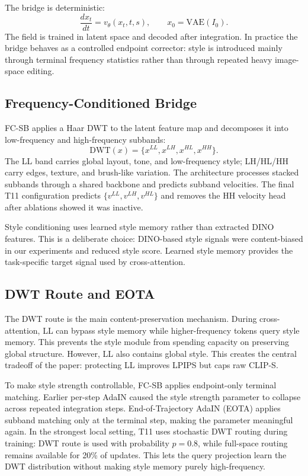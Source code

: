 \documentclass[letterpaper]{article}
\begin{document}
The bridge is deterministic:
\begin{equation}
    \frac{dx_t}{dt}=v_\theta(x_t,t,s),\qquad x_0=\mathrm{VAE}(I_0).
\end{equation}
The field is trained in latent space and decoded after integration. In practice the bridge behaves as a controlled endpoint corrector: style is introduced mainly through terminal frequency statistics rather than through repeated heavy image-space editing.

\subsection{Frequency-Conditioned Bridge}
FC-SB applies a Haar DWT to the latent feature map and decomposes it into low-frequency and high-frequency subbands:
\begin{equation}
    \mathrm{DWT}(x)=\{x^{LL},x^{LH},x^{HL},x^{HH}\}.
\end{equation}
The LL band carries global layout, tone, and low-frequency style; LH/HL/HH carry edges, texture, and brush-like variation. The architecture processes stacked subbands through a shared backbone and predicts subband velocities. The final T11 configuration predicts $\{v^{LL},v^{LH},v^{HL}\}$ and removes the HH velocity head after ablations showed it was inactive.

Style conditioning uses learned style memory rather than extracted DINO features. This is a deliberate choice: DINO-based style signals were content-biased in our experiments and reduced style score. Learned style memory provides the task-specific target signal used by cross-attention.

\subsection{DWT Route and EOTA}
The DWT route is the main content-preservation mechanism. During cross-attention, LL can bypass style memory while higher-frequency tokens query style memory. This prevents the style module from spending capacity on preserving global structure. However, LL also contains global style. This creates the central tradeoff of the paper: protecting LL improves LPIPS but caps raw CLIP-S.

To make style strength controllable, FC-SB applies endpoint-only terminal matching. Earlier per-step AdaIN caused the style strength parameter to collapse across repeated integration steps. End-of-Trajectory AdaIN (EOTA) applies subband matching only at the terminal step, making the parameter meaningful again. In the strongest local setting, T11 uses stochastic DWT routing during training: DWT route is used with probability $p=0.8$, while full-space routing remains available for 20\% of updates. This lets the query projection learn the DWT distribution without making style memory purely high-frequency.
\end{document}
